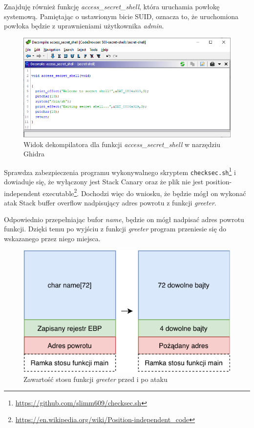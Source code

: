 \documentclass[language=polish,type=eng]{aghmodern}
\begin{document}
Znajduję również funkcję \emph{access\_secret\_shell}, która uruchamia powłokę systemową.
Pamiętając o ustawionym bicie SUID, oznacza to, że uruchomiona powłoka będzie z uprawnieniami
użytkownika \emph{admin}.

\begin{figure}[H]
\centering
\includegraphics[width=\textwidth]{500_access}
\caption{Widok dekompilatora dla funkcji \emph{access\_secret\_shell} w narzędziu Ghidra}
\end{figure}

Sprawdza zabezpieczenia programu wykonywalnego skryptem \texttt{checksec.sh}\footnote{
\url{https://github.com/slimm609/checksec.sh}} i dowiaduje się, że wyłączony jest Stack Canary
oraz że plik nie jest position-independent executable\footnote{
\url{https://en.wikipedia.org/wiki/Position-independent_code}}.
Dochodzi więc do wniosku, że będzie mógł on wykonać atak Stack buffer overflow
nadpisujący adres powrotu z funkcji \emph{greeter}.

Odpowiednio przepełniając bufor \emph{name}, będzie on mógł nadpisać adres powrotu
funkcji. Dzięki temu po wyjściu z funkcji \emph{greeter} program przeniesie się do
wskazanego przez niego miejsca.

\begin{figure}[H]
\centering
\includegraphics[width=\textwidth]{500_stack}
\caption{Zawartość stosu funkcji \emph{greeter} przed i po ataku}
\end{figure}
\end{document}
